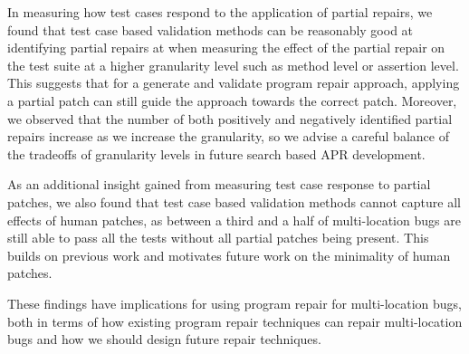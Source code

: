 \documentclass[sigconf, timestamp-false, anonymous=true]{acmart}
\begin{document}
In measuring how test cases respond to the application of partial repairs, we found that 
test case based validation methods can be reasonably good at identifying partial
repairs at when measuring the effect of the partial repair on the test suite at a higher 
granularity level such as method level or assertion level. This suggests that for a generate 
and validate program repair approach, applying a partial patch can still guide the approach 
towards the correct patch. Moreover, 
we observed that the number of both positively and negatively identified partial repairs
increase as we increase the granularity, so we advise a careful balance of the tradeoffs of
granularity levels in future search based APR development.

As an additional insight gained from measuring test case response to partial patches, we 
also found that test case based validation methods cannot capture all effects of human 
patches,
as between a third and a half of multi-location bugs are still able to pass all the tests 
without all partial patches being present. This builds on previous work and motivates 
future work on the minimality of human patches.

These findings have implications for using program repair for multi-location bugs, both in 
terms of how existing program repair techniques can repair multi-location bugs and how 
we should design future repair techniques.




\end{document}
